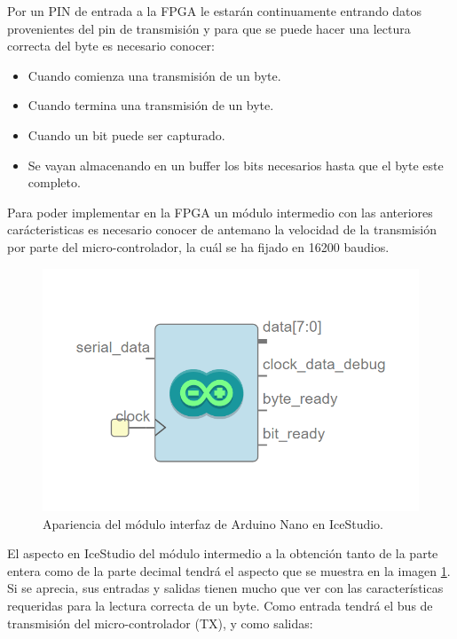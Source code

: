 Por un PIN de entrada a la FPGA le estarán continuamente entrando datos provenientes del pin de transmisión y para que se puede hacer una lectura correcta del byte es necesario conocer: 

\begin{itemize}
	\item Cuando comienza una transmisión de un byte.
	\item Cuando termina una transmisión de un byte.
	\item Cuando un bit puede ser capturado. 
	\item Se vayan almacenando en un buffer los bits necesarios hasta que el byte este completo.
\end{itemize}

Para poder implementar en la FPGA un módulo intermedio con las anteriores carácteristicas es necesario conocer de antemano la velocidad de la transmisión por parte del micro-controlador, la cuál se ha fijado en 16200 baudios. \newline

\begin{figure}[H]
	\center
	\includegraphics[scale=0.6]{imagenes/Balancing_robot/arduino_interface.PNG}
	\caption{Apariencia del módulo interfaz de Arduino Nano en IceStudio.}
	\label{fig:arduino_interface}
\end{figure}


El aspecto en IceStudio del módulo intermedio a la obtención tanto de la parte entera como de la parte decimal tendrá el aspecto que se muestra en la imagen \ref{fig:arduino_interface}. Si se aprecia, sus entradas y salidas tienen mucho que ver con las características requeridas para la lectura correcta de un byte. Como entrada tendrá el bus de transmisión del micro-controlador (TX), y como salidas: 

